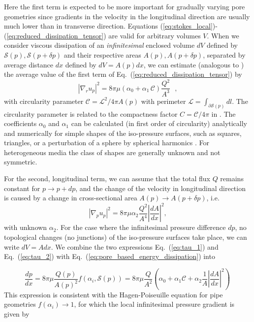 \documentclass[draft]{agujournal2019}
\begin{document}
Here the first term is expected to be more important for gradually varying pore geometries since gradients in the velocity in the longitudinal direction are usually much lower than in transverse direction. Equations (\ref{eq:stokes_local})-(\ref{eq:reduced_dissipation_tensor}) are valid for arbitrary volumes $V$. When we consider viscous dissipation of an \textit{infinitesimal} enclosed volume $dV$ defined by $\mathcal{S}(p),\mathcal{S}(p+\delta p)$ and their respective areas $A(p), A(p+\delta p)$, separated by average distance $dx$ defined by $dV = A(p)dx$, we can estimate (analogous to ) the average value of the first term of Eq.~(\ref{eq:reduced_dissipation_tensor}) by
\begin{equation}
	\left|\nabla_r u_p\right|^2 =8\pi\mu \left(\alpha_0+\alpha_1\,\mathcal{C}\right)\frac{ Q^2}{A^3}~~~ ,\label{eq:tau_1}
\end{equation}
with circularity parameter $\mathcal{C} = \mathcal{L}^2/4\pi A(p)$ with perimeter $\mathcal{L} = \int_{\partial \mathcal{S}(p)}dl$. The circularity parameter is related to the compactness factor $C = \mathcal{C}/4\pi$ in \cite{mortensen_reexamination_2005}. The coefficients $\alpha_0$ and $\alpha_1$ can be calculated (in first order of circularity) analytically and numerically for simple shapes of the iso-pressure surfaces, such as squares, triangles, or a perturbation of a sphere by spherical harmonics \cite{mortensen_reexamination_2005}. For heterogeneous media the class of shapes are generally unknown and not symmetric. 

For the second, longitudinal term, we can assume that the total flux $Q$ remains constant for $p\rightarrow p+dp$, and the change of the velocity in longitudinal direction is caused by a change in cross-sectional area $A(p)\rightarrow A(p+\delta p)$, i.e. 
\begin{equation}
	\left|\nabla_p u_p\right|^2 =  8\pi \mu \alpha_2\frac{Q^2}{A^4}\left|\frac{dA}{dx }\right|^2,\label{eq:tau_2}
\end{equation}
with unknown $\alpha_2$. For the case where the infinitesimal pressure difference $dp$, no topological changes (no junctions) of the iso-pressure surfaces take place, we can write $dV = A dx$. We combine the two expressions Eq.~(\ref{eq:tau_1}) and Eq.~(\ref{eq:tau_2}) with Eq.~(\ref{eq:pore_based_energy_dissipation}) into

\begin{equation}
	\frac{dp}{dx} = 8\pi \mu \frac{Q(p)}{A(p)^2} f\left(\alpha_i,\mathcal{S}(p) \right) = 8 \pi \mu\frac{Q}{A^2}\left(\alpha_0+\alpha_1\mathcal{C} + \alpha_2 \frac{1}{A}\left|\frac{d A}{d x}\right|^2\right)\,\label{eq:infi_dp}
\end{equation}
This expression is consistent with the Hagen-Poiseuille equation for pipe geometries $f(\alpha_i)\rightarrow 1$, for which the local infinitesimal pressure gradient is given by 
\end{document}
